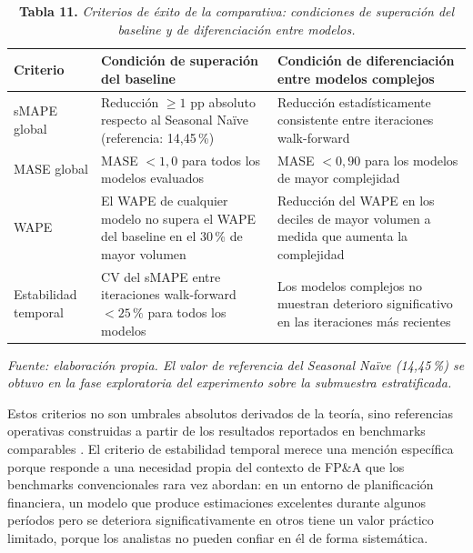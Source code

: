 \begin{table}[H]
\caption{\textbf{Tabla 11.} \textit{Criterios de éxito de la comparativa: condiciones de superación del baseline y de diferenciación entre modelos.}}
\label{tab:criterios}
\vspace{4pt}
\begin{tabular}{>{\raggedright\arraybackslash}p{2.5cm} >{\raggedright\arraybackslash}p{5.5cm} >{\raggedright\arraybackslash}p{5.5cm}}
\toprule
\textbf{Criterio} & \textbf{Condición de superación del baseline} & \textbf{Condición de diferenciación entre modelos complejos} \\
\midrule
sMAPE global & Reducción $\geq 1$ pp absoluto respecto al Seasonal Naïve (referencia: 14,45\,\%) & Reducción estadísticamente consistente entre iteraciones walk-forward \\
MASE global & MASE $< 1{,}0$ para todos los modelos evaluados & MASE $< 0{,}90$ para los modelos de mayor complejidad \\
WAPE & El WAPE de cualquier modelo no supera el WAPE del baseline en el 30\,\% de mayor volumen & Reducción del WAPE en los deciles de mayor volumen a medida que aumenta la complejidad \\
Estabilidad temporal & CV del sMAPE entre iteraciones walk-forward $< 25\,\%$ para todos los modelos & Los modelos complejos no muestran deterioro significativo en las iteraciones más recientes \\
\bottomrule
\end{tabular}
\vspace{4pt}

\small\textit{Fuente: elaboración propia. El valor de referencia del Seasonal Naïve (14,45\,\%) se obtuvo en la fase exploratoria del experimento sobre la submuestra estratificada.}
\end{table}

Estos criterios no son umbrales absolutos derivados de la teoría, sino referencias operativas construidas a partir de los resultados reportados en benchmarks comparables \parencite{Makridakis2022}. El criterio de estabilidad temporal merece una mención específica porque responde a una necesidad propia del contexto de FP\&A que los benchmarks convencionales rara vez abordan: en un entorno de planificación financiera, un modelo que produce estimaciones excelentes durante algunos períodos pero se deteriora significativamente en otros tiene un valor práctico limitado, porque los analistas no pueden confiar en él de forma sistemática.
